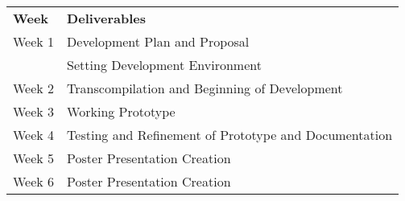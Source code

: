 \documentclass{article}
\begin{document}
\begin{center}
\begin{tabular}{ l | l }
  \textbf{Week} & \textbf{Deliverables} \\
  \hhline{=|=}
  Week 1 & Development Plan and Proposal\\
         & Setting Development Environment\\ 
  Week 2 & Transcompilation and Beginning of Development\\
  Week 3 & Working Prototype\\
  Week 4 & Testing and Refinement of Prototype and Documentation\\
  Week 5 & Poster Presentation Creation\\
  Week 6 & Poster Presentation Creation\\
\end{tabular}
\end{center}

\end{document}
